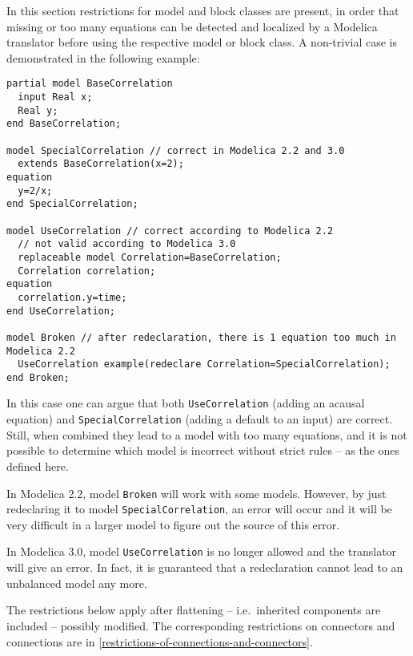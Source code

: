\begin{nonnormative}
In this section restrictions for model and block classes are
present, in order that missing or too many equations can be detected and
localized by a Modelica translator before using the respective model or
block class. A non-trivial case is demonstrated in the following
example:
\begin{lstlisting}[language=modelica]
partial model BaseCorrelation
  input Real x;
  Real y;
end BaseCorrelation;

model SpecialCorrelation // correct in Modelica 2.2 and 3.0
  extends BaseCorrelation(x=2);
equation
  y=2/x;
end SpecialCorrelation;

model UseCorrelation // correct according to Modelica 2.2
  // not valid according to Modelica 3.0
  replaceable model Correlation=BaseCorrelation;
  Correlation correlation;
equation
  correlation.y=time;
end UseCorrelation;

model Broken // after redeclaration, there is 1 equation too much in Modelica 2.2
  UseCorrelation example(redeclare Correlation=SpecialCorrelation);
end Broken;
\end{lstlisting}

In this case one can argue that both \lstinline!UseCorrelation! (adding an acausal equation) and \lstinline!SpecialCorrelation! (adding a default to an input) are correct.  Still, when combined they
lead to a model with too many equations, and it is not possible to determine which model is incorrect without strict rules -- as the ones defined here.

In Modelica 2.2, model \lstinline!Broken! will work with some models.
However, by just redeclaring it to model \lstinline!SpecialCorrelation!, an
error will occur and it will be very difficult in a larger model to
figure out the source of this error.

In Modelica 3.0, model \lstinline!UseCorrelation! is no longer allowed
and the translator will give an error. In fact, it is guaranteed that a
redeclaration cannot lead to an unbalanced model any more.
\end{nonnormative}

The restrictions below apply after flattening -- i.e.\ inherited components are included -- possibly modified.  The corresponding restrictions on connectors and connections are in
\cref{restrictions-of-connections-and-connectors}.

